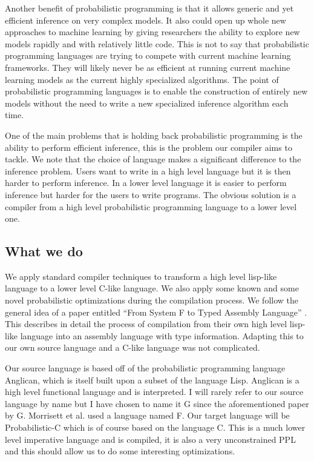 \documentclass[a4paper]{article}
\begin{document}
Another benefit of probabilistic programming is that it allows generic and yet efficient inference on very complex models. It also could open up whole new approaches to machine learning by giving researchers the ability to explore new models rapidly and with relatively little code. This is not to say that probabilistic programming languages are trying to compete with current machine learning frameworks. They will likely never be as efficient at running current machine learning models as the current highly specialized algorithms. The point of probabilistic programming languages is to enable the construction of entirely new models without the need to write a new specialized inference algorithm each time.

One of the main problems that is holding back probabilistic programming is the ability to perform efficient inference, this is the problem our compiler aims to tackle. We note that the choice of language makes a significant difference to the inference problem. Users want to write in a high level language but it is then harder to perform inference. In a lower level language it is easier to perform inference but harder for the users to write programs. The obvious solution is a compiler from a high level probabilistic programming language to a lower level one.



\subsection{What we do}

We apply standard compiler techniques to transform a high level lisp-like language to a lower level C-like language. We also apply some known and some novel probabilistic optimizations during the compilation process. We follow the general idea of a paper entitled ``From System F to Typed Assembly Language'' \cite{SystemF}. This describes in detail the process of compilation from their own high level lisp-like language into an assembly language with type information. Adapting this to our own source language and a C-like language was not complicated.

Our source language is based off of the probabilistic programming language Anglican, which is itself built upon a subset of the language Lisp. Anglican is a high level functional language and is interpreted. I will rarely refer to our source language by name but I have chosen to name it G since the aforementioned paper by G. Morrisett et al. used a language named F. Our target language will be Probabilistic-C which is of course based on the language C. This is a much lower level imperative language and is compiled, it is also a very unconstrained PPL and this should allow us to do some interesting optimizations.
\end{document}
